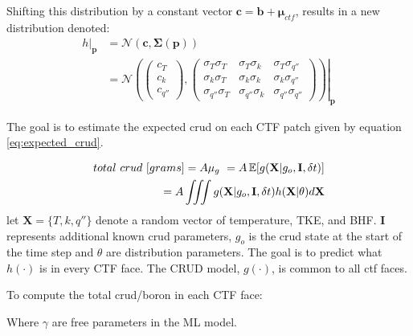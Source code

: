 Shifting this distribution by a constant vector $\bm c=\bm b + \bm \mu_{ctf}$, results in a new distribution denoted:
\begin{align}
    \left. h \right|_{\bm p} & = \mathcal N(\bm c, \bm \Sigma(\mathbf p)) \nonumber \\
    & = \left.
        \mathcal N \left(
        \begin{pmatrix}
            c_T \\
            c_k \\
            c_{q''}
        \end{pmatrix}
    ,
        \begin{pmatrix}
            \sigma_{T} \sigma_{T} & \sigma_{T} \sigma_{k} & \sigma_{T} \sigma_{q''} \\
            \sigma_{k} \sigma_{T} & \sigma_{k} \sigma_{k} & \sigma_{k} \sigma_{q''} \\
            \sigma_{q''} \sigma_{T} & \sigma_{q''} \sigma_{k} & \sigma_{q''} \sigma_{q''}
        \end{pmatrix}
    \right)
    \right|_{\mathbf p}
\end{align}


The goal is to estimate the expected crud on each CTF patch given by equation \ref{eq:expected_crud}.

\begin{eqnarray}
        total\ crud\ [grams] = A \mu_g\ = A \operatorname*{\mathbb{E}}[g(\mathbf X|g_o, \mathbf I, \delta t)] \nonumber \\
        = A \iiint g(\mathbf X|g_o, \mathbf I, \delta t) h(\mathbf X|\theta) d \mathbf X
        \label{eq:expected_crud}
\end{eqnarray}
let $\mathbf X= \{T, k, q''\}$ denote a random vector of temperature, TKE, and BHF. $\mathbf I$ represents additional known crud parameters, $g_o$ is the crud state at the start of the time step and $\theta$ are distribution parameters.  The goal is to predict what $h(\cdot)$ is in every CTF face.  The CRUD model, $g(\cdot)$, is common to all ctf faces.

To compute the total crud/boron in each CTF face:
\\

\begin{algorithm}[H]

\end{algorithm}
Where $\gamma$ are free parameters in the ML model.
\bigskip

